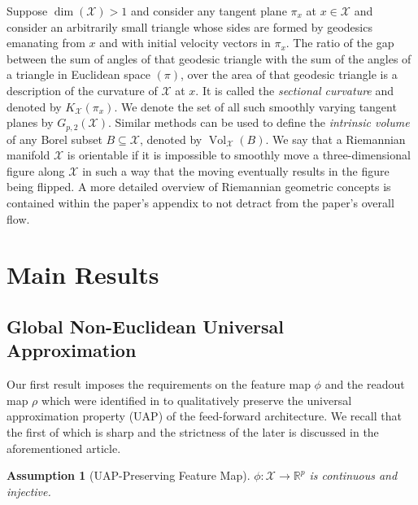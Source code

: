 \documentclass[anon,12pt]{colt2021} %
\newcommand{\xxx}{\mathcal{X}}
\newtheorem{assumption}{Assumption}
\begin{document}
Suppose $\dim(\xxx)>1$ and consider any tangent plane $\pi_x$ at $x\in \xxx$ and consider an arbitrarily small triangle whose sides are formed by geodesics emanating from $x$ and with initial velocity vectors in $\pi_x$.  The ratio of the gap between the sum of angles of that geodesic triangle with the sum of the angles of a triangle in Euclidean space $(\pi)$, over the area of that geodesic triangle is a description of the curvature of $\xxx$ at $x$.  It is called the \textit{sectional curvature} and denoted by $K_{\xxx}(\pi_x)$.  
We denote the set of all such smoothly varying tangent planes by $G_{p,2}(\xxx)$.
Similar methods can be used to define the \textit{intrinsic volume} of any Borel subset $B\subseteq \xxx$, denoted by $\operatorname{Vol}_{\xxx}(B)$.  We say that a Riemannian manifold $\xxx$ is orientable if it is impossible to smoothly move a three-dimensional figure along $\xxx$ in such a way that the moving eventually results in the figure being flipped. 
A more detailed overview of Riemannian geometric concepts is contained within the paper's appendix to not detract from the paper's overall flow.   
\section{Main Results}\label{s_main_results}
\subsection{Global Non-Euclidean Universal Approximation}\label{ss_Main_global}

Our first result imposes the requirements on the feature map $\phi$ and the readout map $\rho$ which were identified in \cite{kratsios2020non} to qualitatively preserve the universal approximation property (UAP) of the feed-forward architecture.  We recall that the first of which is sharp and the strictness of the later is discussed in the aforementioned article.  
\begin{assumption}[UAP-Preserving Feature Map]\label{assumptionPhi} 
$\phi: \mathcal{X} \rightarrow \mathbb{R}^{p}$ is continuous and injective.
\end{assumption}
\end{document}

